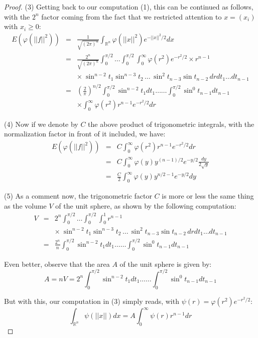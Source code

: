 \documentclass[10pt,a4paper]{amsart}
\begin{document}
\begin{proof}
(3) Getting back to our computation (1), this can be continued as follows, with the $2^n$ factor coming from the fact that we restricted attention to $x=(x_i)$ with $x_i\geq0$:
\begin{eqnarray*}
E\left(\varphi(||f||^2)\right)
&=&\frac{1}{\sqrt{(2\pi)^n}}\int_{\mathbb R^n}\varphi(||x||^2)e^{-||x||^2/2}dx\\
&=&\frac{2^n}{\sqrt{(2\pi)^n}}\int_0^{\pi/2}\ldots\int_0^{\pi/2}\int_0^\infty\varphi(r^2)e^{-r^2/2}\times r^{n-1}\\
&&\times\ \sin^{n-2}t_1\sin^{n-3}t_2\,\ldots\,\sin^2t_{n-3}\sin t_{n-2}\,drdt_1\ldots dt_{n-1}\\
&=&\left(\frac{2}{\pi}\right)^{n/2}\int_0^{\pi/2}\sin^{n-2}t_1dt_1\ldots\ldots\int_0^{\pi/2}\sin^0t_{n-1}dt_{n-1}\\
&&\times\int_0^\infty\varphi(r^2)r^{n-1}e^{-r^2/2}dr
\end{eqnarray*}

(4) Now if we denote by $C$ the above product of trigonometric integrals, with the normalization factor in front of it included, we have:
\begin{eqnarray*}
E\left(\varphi(||f||^2)\right)
&=&C\int_0^\infty\varphi(r^2)r^{n-1}e^{-r^2/2}dr\\
&=&C\int_0^\infty\varphi(y)y^{(n-1)/2}e^{-y/2}\frac{dy}{2\sqrt{y}}\\
&=&\frac{C}{2}\int_0^\infty\varphi(y)y^{n/2-1}e^{-y/2}dy
\end{eqnarray*}

(5) As a comment now, the trigonometric factor $C$ is more or less the same thing as the volume $V$ of the unit sphere, as shown by the following computation:
\begin{eqnarray*}
V
&=&2^n\int_0^{\pi/2}\ldots\int_0^{\pi/2}\int_0^1r^{n-1}\\
&&\times\ \sin^{n-2}t_1\sin^{n-3}t_2\,\ldots\,\sin^2t_{n-3}\sin t_{n-2}\,drdt_1\ldots dt_{n-1}\\
&=&\frac{2^n}{n}\int_0^{\pi/2}\sin^{n-2}t_1dt_1\ldots\ldots\int_0^{\pi/2}\sin^0t_{n-1}dt_{n-1}
\end{eqnarray*}

Even better, observe that the area $A$ of the unit sphere is given by:
$$A=nV=2^n\int_0^{\pi/2}\sin^{n-2}t_1dt_1\ldots\ldots\int_0^{\pi/2}\sin^0t_{n-1}dt_{n-1}$$

But with this, our computation in (3) simply reads, with $\psi(r)=\varphi(r^2)e^{-r^2/2}$:
$$\int_{\mathbb R^n}\psi(||x||)dx=A\int_0^\infty\psi(r)r^{n-1}dr$$


\end{proof}
\end{document}
